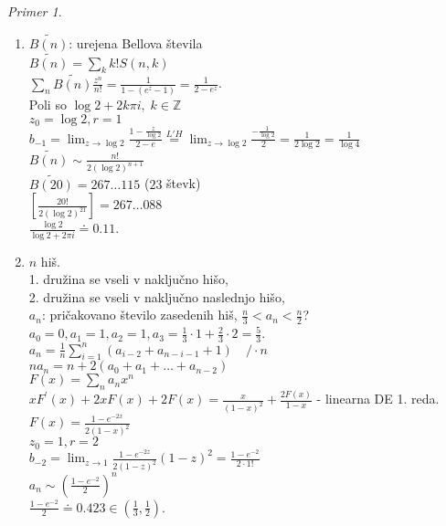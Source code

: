 \documentclass[a4paper, 12pt]{book}
\theoremstyle{definition}
\theoremstyle{remark}
\newtheorem*{ex}{Primer}
\newcommand{\Z}{\mathbb{Z}}
\begin{document}
\begin{ex}
\begin{enumerate}[label=(\arabic*)]
    \item $\widetilde{B(n)}$: urejena Bellova števila \\
      $\widetilde{B(n)} = \sum_k k! S(n,k)$ \\
      $\sum_n \widetilde{B(n)} \frac{z^n}{n!} = \frac{1}{1 - (e^z-1)} = \frac{1}{2-e^z}$. \\
      Poli so $\log 2 + 2 k \pi i, \; k \in \Z$ \\
      $z_0 = \log 2, r = 1$ \\
      $b_{-1} = \lim_{z \to \log 2} \frac{1 - \frac{z}{\log 2}}{2 - e} \stackrel{L'H}{=}
      \lim_{z \to \log 2} \frac{-\frac{1}{\log 2}}{2} = \frac{1}{2 \log 2} = \frac{1}{\log 4}$ \\
      $\widetilde{B(n)} \sim \frac{n!}{2 (\log 2)^{n+1}}$ \\
      $\widetilde{B(20)} = 267 \dots 115$ ($23$ števk) \\
      $\left[\frac{20!}{2 (\log 2)^{21}}\right] = 267 \dots 088$ \\
      $\frac{\log 2}{\log 2 + 2 \pi i} \doteq 0.11$.
    \item $n$ hiš. \\
      1. družina se vseli v naključno hišo, \\
      2. družina se vseli v naključno naslednjo hišo, \\
      $a_n$: pričakovano število zasedenih hiš, $\frac{n}{3} < a_n < \frac{n}{2}$? \\
      $a_0 = 0, a_1 = 1, a_2 = 1, a_3 = \frac{1}{3} \cdot 1 + \frac{2}{3} \cdot 2 = \frac{5}{3}$. \\
      $a_n = \frac{1}{n} \sum_{i=1}^{n} (a_{i-2} + a_{n-i-1} + 1) \quad / \cdot n$ \\
      $n a_n = n + 2(a_0 + a_1 + \dots + a_{n-2})$ \\
      $F(x) = \sum_n a_n x^n$ \\
      $x F^{'}(x) + 2 x F(x) + 2 F(x) = \frac{x}{(1-x)^2} + \frac{2 F(x)}{1-x}$ - linearna DE 1. reda. \\
      $F(x) = \frac{1 - e^{-2x}}{2 (1-x)^2}$ \\
      $z_0 = 1, r = 2$ \\
      $b_{-2} = \lim_{z \to 1} \frac{1 - e^{-2z}}{2 (1-z)^2} (1-z)^2 = \frac{1 - e^{-2}}{2 \cdot 1!}$ \\
      $a_n \sim \left(\frac{1-e^{-2}}{2}\right)^n$ \\
      $\frac{1-e^{-2}}{2} \doteq 0.423 \in \left(\frac{1}{3}, \frac{1}{2}\right)$.
  \end{enumerate}
\end{ex}
\end{document}
